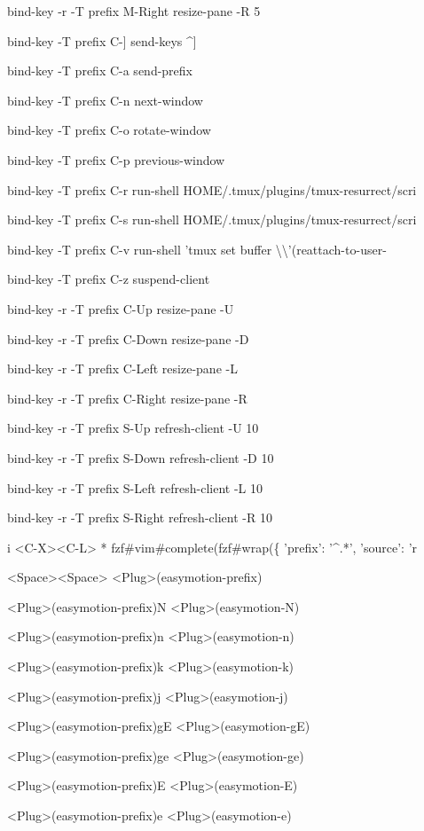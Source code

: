 \documentclass[11pt,a4paper,twoside]{book}
\begin{document}
bind-key -r -T prefix  M-Right  resize-pane -R 5

bind-key  -T prefix  C-]  send-keys \textasciicircum{}]

bind-key  -T prefix  C-a  send-prefix

bind-key  -T prefix  C-n  next-window

bind-key  -T prefix  C-o  rotate-window

bind-key  -T prefix  C-p  previous-window

bind-key  -T prefix  C-r  run-shell HOME/.tmux/plugins/tmux-resurrect/scri

bind-key  -T prefix  C-s  run-shell HOME/.tmux/plugins/tmux-resurrect/scri

bind-key  -T prefix  C-v  run-shell 'tmux set buffer \textbackslash{}\textbackslash{}'(reattach-to-user-

bind-key  -T prefix  C-z  suspend-client

bind-key -r -T prefix  C-Up  resize-pane -U

bind-key -r -T prefix  C-Down  resize-pane -D

bind-key -r -T prefix  C-Left  resize-pane -L

bind-key -r -T prefix  C-Right  resize-pane -R

bind-key -r -T prefix  S-Up  refresh-client -U 10

bind-key -r -T prefix  S-Down  refresh-client -D 10

bind-key -r -T prefix  S-Left  refresh-client -L 10

bind-key -r -T prefix  S-Right  refresh-client -R 10

i  <C-X><C-L>  * fzf\#vim\#complete(fzf\#wrap(\{ 'prefix': '\textasciicircum{}.*', 'source': 'r

<Space><Space>  <Plug>(easymotion-prefix)

<Plug>(easymotion-prefix)N  <Plug>(easymotion-N)

<Plug>(easymotion-prefix)n  <Plug>(easymotion-n)

<Plug>(easymotion-prefix)k  <Plug>(easymotion-k)

<Plug>(easymotion-prefix)j  <Plug>(easymotion-j)

<Plug>(easymotion-prefix)gE  <Plug>(easymotion-gE)

<Plug>(easymotion-prefix)ge  <Plug>(easymotion-ge)

<Plug>(easymotion-prefix)E  <Plug>(easymotion-E)

<Plug>(easymotion-prefix)e  <Plug>(easymotion-e)
\end{document}
